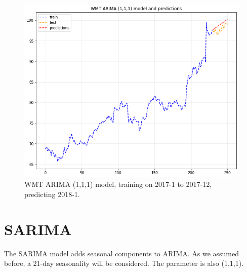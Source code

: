 \documentclass[11pt]{article}
\begin{document}
\begin{figure}[h!]
\centerline{\includegraphics[scale=0.5]{arima_p3.png}}
\caption{WMT ARIMA (1,1,1) model, training on 2017-1 to 2017-12, predicting 2018-1.}
\end{figure}

\newpage

\section{SARIMA}\label{section-sarima}

The SARIMA model adds seasonal components to ARIMA. As we assumed before, a 21-day seasonality will be considered. The parameter is also (1,1,1).
\end{document}
